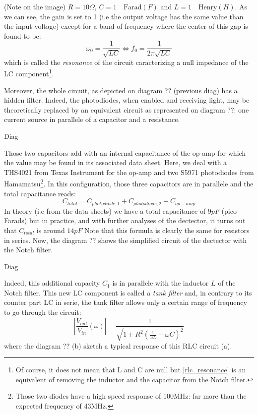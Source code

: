 \documentclass[12pt]{report}
\begin{document}
(Note on the image) $R = 10\Omega$, $C = 1 \quad\textrm{Farad}(F)$ and $L = 1 \quad\textrm{Henry}(H)$. As we can see, the gain is set to 1 (i.e the output voltage has the same value than the input voltage) except for a band of frequency where the center of this gap is found to be:
\begin{equation}
\label{rlc_resonance}
\omega_0 = \frac{1}{\sqrt{LC}} \Leftrightarrow f_0 = \frac{1}{2\pi\sqrt{LC}}
\end{equation}
which is called the \textit{resonance} of the circuit caracterizing a null impedance of the LC component\footnote{Of course, it does not mean that L and C are null but \eqref{rlc_resonance} is an equivalent of removing the inductor and the capacitor from the Notch filter.}.

Moreover, the whole circuit, as depicted on diagram ?? (previous diag) has a hidden filter. Indeed, the photodiodes, when enabled and receiving light, may be theoretically replaced by an equivalent circuit as represented on diagram ??: one current source in parallele of a capacitor and a resistance.

Diag

Those two capacitors add with an internal capacitance of the op-amp for which the value may be found in its associated data sheet. Here, we deal with a THS4021 from Texas Instrument for the op-amp and two S5971 photodiodes from Hamamatsu\footnote{Those two diodes have a high speed response of 100MHz: far more than the expected frequency of 43MHz.}. In this configuration, those three capacitors are in parallele and the total capacitance reads:
\begin{equation}
C_{total} = C_{photodiode,1} + C_{photodiode,2} + C_{op-amp}
\end{equation}
In theory (i.e from the data sheets) we have a total capacitance of $9pF$ (pico-Farads) but in practice, and with further analyses of the dectector, it turns out that $C_{total}$ is around $14pF$ Note that this formula is clearly the same for resistors in series. Now, the diagram ?? shows the simplified circuit of the dectector with the Notch filter.

Diag

Indeed, this additional capacity $C_1$ is in parallele with the inductor $L$ of the Notch filter. This new LC component is called a \textit{tank filter} and, in contrary to its counter part LC in serie, the tank filter allows only a certain range of frequency to go through the circuit:
\begin{equation}
\left\lvert \frac{V_{out}}{V_{in}} (\omega) \right\rvert = \frac{1}{\sqrt{1 + R^2\left(\frac{1}{\omega L} - \omega C\right)^2}}
\end{equation}
where the diagram ?? (b) sketch a typical response of this RLC circuit (a). 
\end{document}
